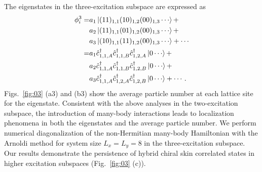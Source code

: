 \documentclass[longbibliography, aps, prx, amsmath, amssymb, amsfonts, twocolumn,superscriptaddress, footinbib]{revtex4-1}
\begin{document}
	The eigenstates in the three-excitation subspace are expressed as 
	\begin{equation}
		\begin{split}
			\phi_i^3 =& a_1 \ket{(11)_{1,1}(10)_{1,2}(00)_{1,3}\cdots} +\\
			&a_2 \ket{(11)_{1,1}(01)_{1,2}(00)_{1,3}\cdots} +\\
			&a_3 \ket{(10)_{1,1}(11)_{1,2}(00)_{1,3}\cdots} + \cdots\\
			=& a_1 \hat{c}_{1,1,A}^{\dagger}\hat{c}_{1,1,B}^{\dagger}\hat{c}_{1,2,A}^{\dagger} \ket{0\cdots} +\\
			&a_2 \hat{c}_{1,1,A}^{\dagger}\hat{c}_{1,1,B}^{\dagger}\hat{c}_{1,2,B}^{\dagger} \ket{0\cdots} + \\
			&a_3 \hat{c}_{1,1,A}^{\dagger}\hat{c}_{1,2,A}^{\dagger}\hat{c}_{1,2,B}^{\dagger} \ket{0\cdots} + \cdots.
		\end{split}
	\end{equation}
	Figs.~\ref{fig:03} (a3) and (b3) show the average particle number at each lattice site for the eigenstate. 
	Consistent with the above analyses in the two-excitation subspace, the introduction of many-body interactions leads to localization phenomena in both the eigenstates and the average particle number.
	We perform numerical diagonalization of the non-Hermitian many-body Hamiltonian with the Arnoldi method for system size $L_x = L_y = 8$ in the three-excitation subspace. Our results demonstrate the persistence of hybrid chiral skin correlated states in higher excitation subspaces (Fig.~\ref{fig:03} (c)).
\end{document}
